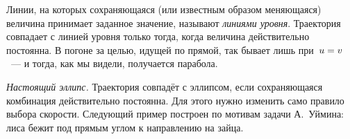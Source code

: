 \documentclass[../main.tex]{subfiles}
\begin{document}

Линии, на которых сохраняющаяся (или известным образом меняющаяся) величина
принимает заданное значение, называют \textit{линиями уровня}. Траектория совпадает
с линией уровня только тогда, когда величина действительно постоянна. В погоне за
целью, идущей по прямой, так бывает лишь при~$u \hm= v$~--- и тогда, как мы видели,
получается парабола.

\noindent\textit{Настоящий эллипс.} Траектория совпадёт с эллипсом, если
сохраняющаяся комбинация действительно постоянна. Для этого нужно изменить само
правило выбора скорости. Следующий пример построен по мотивам задачи А.~Уймина:
лиса бежит под прямым углом к направлению на зайца.
\end{document}
